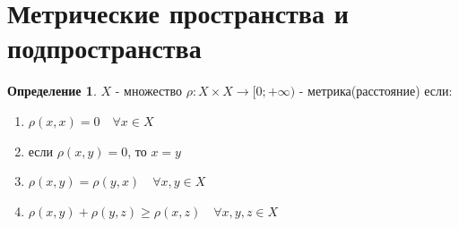 \documentclass[12pt,letterpaper]{report}
\theoremstyle{definition}
\newtheorem*{conj}{Определение}
\begin{document}
\section{Метрические пространства и подпространства}
    \begin{conj}
        $X$ - множество $\rho : X \times X \longrightarrow [0; + \infty)$ - метрика(расстояние)
        если: 
        \begin{enumerate}
            \item $\rho(x, x) = 0 \quad \forall x \in X$
            \item если $\rho(x, y) = 0$, то $x = y$
            \item $\rho(x, y) = \rho(y, x) \quad \forall x, y \in X$
            \item $\rho(x, y) + \rho(y, z) \geqslant \rho(x, z) \quad \forall x, y, z \in X$
        \end{enumerate}
    \end{conj}
\end{document}
